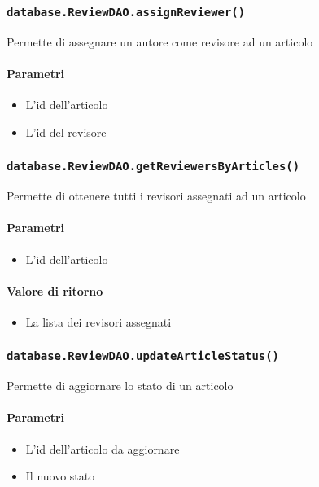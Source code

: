 \subsubsection{\texttt{database.ReviewDAO.assignReviewer()}}
Permette di assegnare un autore come revisore ad un articolo
\paragraph{Parametri}
\begin{itemize}
\item L'id dell'articolo
\item L'id del revisore
\end{itemize}

\subsubsection{\texttt{database.ReviewDAO.getReviewersByArticles()}}
Permette di ottenere tutti i revisori assegnati ad un articolo
\paragraph{Parametri}
\begin{itemize}
\item L'id dell'articolo
\end{itemize}
\paragraph{Valore di ritorno}
\begin{itemize}
\item La lista dei revisori assegnati
\end{itemize}

\subsubsection{\texttt{database.ReviewDAO.updateArticleStatus()}}
Permette di aggiornare lo stato di un articolo
\paragraph{Parametri}
\begin{itemize}
\item L'id dell'articolo da aggiornare
\item Il nuovo stato
\end{itemize}

